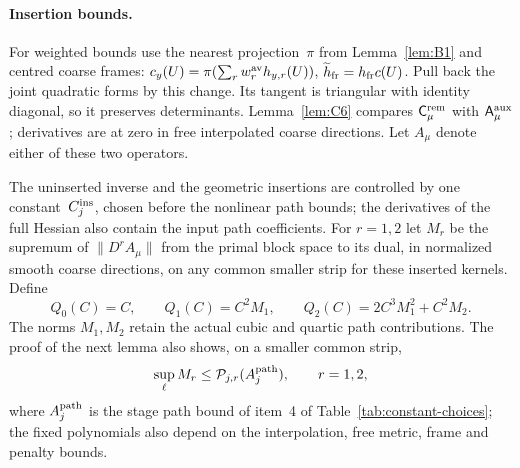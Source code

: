 \paragraph{Insertion bounds.} For weighted bounds use the nearest projection~$\pi$ from Lemma~\ref{lem:B1} and centred coarse frames: $c_y(U)=\pi(\sum_r w_r^{\rm av}h_{y,r}(U))$, $\widetilde h_{\rm fr}=h_{\rm fr}c(U)$. Pull back the joint quadratic forms by this change. Its tangent is triangular with identity diagonal, so it preserves determinants. Lemma~\ref{lem:C6} compares $\mathsf C^{\rm rem}_\mu$ with $\mathsf A^{\rm aux}_\mu$; derivatives are at zero in free interpolated coarse directions. Let $A_\mu$ denote either of these two operators.

The uninserted inverse and the geometric insertions are controlled by one constant~$C_j^{\rm ins}$, chosen before the nonlinear path bounds; the derivatives of the full Hessian also contain the input path coefficients. For $r=1,2$ let $M_r$ be the supremum of $\|D^rA_\mu\|$ from the primal block space to its dual, in normalized smooth coarse directions, on any common smaller strip for these inserted kernels. Define
\begin{equation*}
Q_0(C)=C,\qquad Q_1(C)=C^2M_1,\qquad
Q_2(C)=2C^3M_1^2+C^2M_2.
\end{equation*}
The norms $M_1,M_2$ retain the actual cubic and quartic path contributions. The proof of the next lemma also shows, on a smaller common strip,
\begin{equation}\label{eq:B-Mr}
\sup_\ell M_r\le\mathcal P_{j,r}(A_j^{\rm path}),\qquad r=1,2,
\end{equation}
where $A_j^{\rm path}$ is the stage path bound of item~4 of Table~\ref{tab:constant-choices}; the fixed polynomials also depend on the interpolation, free metric, frame and penalty bounds.

